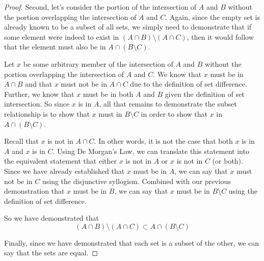 \documentclass[main.tex]{subfiles}
\begin{document}
\begin{proof}
	\medskip
	Second, let's consider the portion of the intersection of \(A\) and
	\(B\) without the portion overlapping the intersection of \(A\) and
	\(C\). Again, since the empty set is already known to be a subset of all
	sets, we simply need to demonstrate that if some element were indeed to
	exist in \((A \cap B) \setminus (A \cap C)\), then it would follow that
	the element must also be in \(A \cap (B \setminus C)\).

	Let \(x\) be some arbitrary member of the intersection of \(A\) and
	\(B\) without the portion overlapping the intersection of \(A\) and
	\(C\). We know that \(x\) must be in \(A \cap B\) and that \(x\) must
	not be in \(A \cap C\) due to the definition of set difference. Further,
	we know that \(x\) must be in both \(A\) and \(B\) given the definition
	of set intersection. So since \(x\) is in \(A\), all that remains to
	demonstrate the subset relationship is to show that \(x\) must in
	\(B \setminus C\) in order to show that \(x\) in
	\(A \cap (B \setminus C)\).

	Recall that \(x\) is not in \(A \cap C\). In other words, it is not the
	case that both \(x\) is in \(A\) and \(x\) is in \(C\). Using De
	Morgan's Law, we can translate this statement into the equivalent
	statement that either \(x\) is not in \(A\) or \(x\) is not in \(C\) (or
	both). Since we have already established that \(x\) must be in \(A\), we
	can say that \(x\) must not be in \(C\) using the disjunctive syllogism.
	Combined with our previous demonstration that \(x\) must be in \(B\),
	we can say that \(x\) must be in \(B \setminus C\) using the definition
	of set difference.

	So we have demonstrated that
	\[(A \cap B) \setminus (A \cap C) \subset A \cap (B \setminus C)\]

	\medskip
	Finally, since we have demonstrated that each set is a subset of the
	other, we can say that the sets are equal.
\end{proof}
\end{document}
